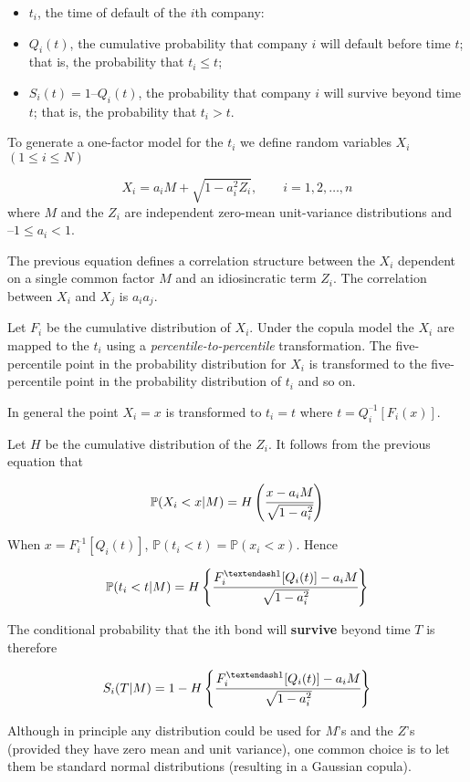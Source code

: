\begin{itemize}
	\tightlist
	\item
	\(t_i\), the time of default of the \(i\)th company:
	\item
	\(Q_i(t)\), the cumulative probability that company \(i\) will default
	before time \(t\); that is, the probability that \(t_i \le t\);
	\item
	\(S_i(t) = 1 – Q_i(t)\), the probability that company \(i\) will
	survive beyond time \(t\); that is, the probability that \(t_i > t\).
\end{itemize}

To generate a one-factor model for the \(t_i\) we define random
variables \(X_i\) \((1\le i \le N)\)

\[X_i = a_i M + \sqrt{1-a_i^2 Z_i},\qquad i = 1, 2,\ldots, n\]
where \(M\) and the \(Z_i\) are independent zero-mean unit-variance
distributions and \(–1 \le a_i \lt 1\).

The previous equation defines a correlation structure between the
\(X_i\) dependent on a single common factor \(M\) and an idiosincratic term $Z_i$. The correlation
between \(X_i\) and \(X_j\) is \(a_i a_j\).

Let \(F_i\) be the cumulative distribution of \(X_i\). Under the copula
model the \(X_i\) are mapped to the \(t_i\) using a
\emph{percentile-to-percentile} transformation. The five-percentile
point in the probability distribution for \(X_i\) is transformed to the
five-percentile point in the probability distribution of \(t_i\) and so
on.

In general the point \(X_i = x\) is transformed to \(t_i = t\) where
\(t = Q_i^{–1}[F_i(x)]\).

Let \(H\) be the cumulative distribution of the \(Z_i\). It follows from
the previous equation that

\[\mathbb{P}(X_i < x|M) = H\left(\cfrac{x-a_i M}{\sqrt{1-a_i^2}}\right)\]

When \(x = F_i^{–1}[Q_i(t)]\),
\(\mathbb{P}(t_i < t) = \mathbb{P}(x_i < x)\). Hence

\[\mathbb{P}(t_i < t|M) = H\left\{\cfrac{F_i^{–1}[Q_i(t)]-a_i M}{\sqrt{1-a_i^2}}\right\}\]

The conditional probability that the ith bond will \textbf{survive}
beyond time \(T\) is therefore

\[S_i(T|M) = 1 - H\left\{\cfrac{F_i^{–1}[Q_i(t)]-a_i M}{\sqrt{1-a_i^2}}\right\}\]

Although in principle any distribution could be used for \(M\)'s and the
\(Z\)'s (provided they have zero mean and unit variance), one common
choice is to let them be standard normal distributions (resulting in a
Gaussian copula).

